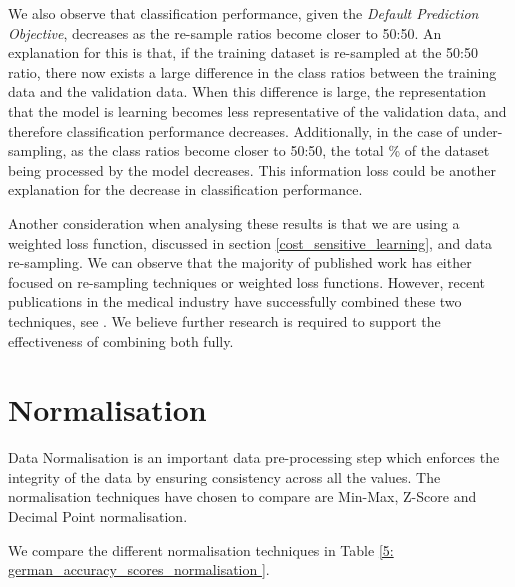         We also observe that classification performance, given the \textit{Default Prediction Objective}, decreases as the re-sample ratios become closer to 50:50. An explanation for this is that, if the training dataset is re-sampled at the 50:50 ratio, there now exists a large difference in the class ratios between the training data and the validation data. When this difference is large, the representation that the model is learning becomes less representative of the validation data, and therefore classification performance decreases. Additionally, in the case of under-sampling, as the class ratios become closer to 50:50, the total \% of the dataset being processed by the model decreases. This information loss could be another explanation for the decrease in classification performance.    
        
        Another consideration when analysing these results is that we are using a weighted loss function, discussed in section \ref{cost_sensitive_learning}, and data re-sampling. We can observe that the majority of published work has either focused on re-sampling techniques or weighted loss functions. However, recent publications in the medical industry have successfully combined these two techniques, see \cite{undersampling_CSL_medical}. We believe further research is required to support the effectiveness of combining both fully. 
    
    \section{Normalisation} \label{normalisation_results}
        Data Normalisation is an important data pre-processing step which enforces the integrity of the data by ensuring consistency across all the values. The normalisation techniques have chosen to compare are Min-Max, Z-Score and Decimal Point normalisation. 

       \vspace{20pt} \noindent We compare the different normalisation techniques in Table \ref{5: german_accuracy_scores_normalisation }.
    
